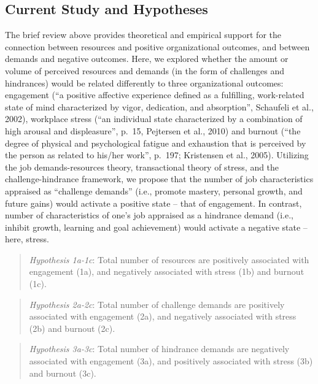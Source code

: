 \documentclass[
  man]{apa6}
\begin{document}
\hypertarget{current-study-and-hypotheses}{%
\subsection{Current Study and Hypotheses}\label{current-study-and-hypotheses}}

The brief review above provides theoretical and empirical support for the connection between resources and positive organizational outcomes, and between demands and negative outcomes. Here, we explored whether the amount or volume of perceived resources and demands (in the form of challenges and hindrances) would be related differently to three organizational outcomes: engagement (``a positive affective experience defined as a fulfilling, work-related state of mind characterized by vigor, dedication, and absorption'', Schaufeli et al., 2002), workplace stress (``an individual state characterized by a combination of high arousal and displeasure'', p.~15, Pejtersen et al., 2010) and burnout (``the degree of physical and psychological fatigue and exhaustion that is perceived by the person as related to his/her work'', p.~197; Kristensen et al., 2005). Utilizing the job demands-resources theory, transactional theory of stress, and the challenge-hindrance framework, we propose that the number of job characteristics appraised as ``challenge demands'' (i.e., promote mastery, personal growth, and future gains) would activate a positive state -- that of engagement. In contrast, number of characteristics of one's job appraised as a hindrance demand (i.e., inhibit growth, learning and goal achievement) would activate a negative state -- here, stress.

\begin{quote}
\emph{Hypothesis 1a-1c}: Total number of resources are positively associated with engagement (1a), and negatively associated with stress (1b) and burnout (1c).
\end{quote}

\begin{quote}
\emph{Hypothesis 2a-2c}: Total number of challenge demands are positively associated with engagement (2a), and negatively associated with stress (2b) and burnout (2c).
\end{quote}

\begin{quote}
\emph{Hypothesis 3a-3c}: Total number of hindrance demands are negatively associated with engagement (3a), and positively associated with stress (3b) and burnout (3c).
\end{quote}
\end{document}
